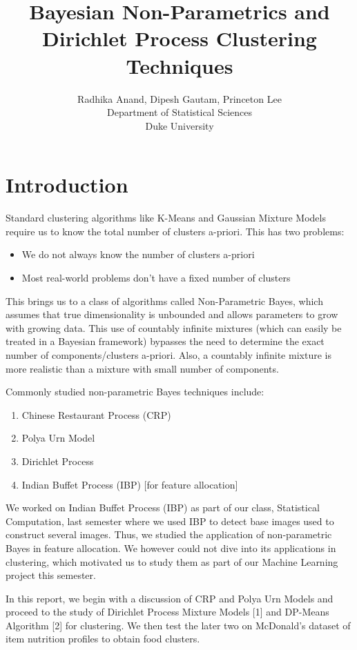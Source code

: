 \documentclass{article} %
\title{Bayesian Non-Parametrics and Dirichlet Process Clustering Techniques}
\author{
Radhika Anand, Dipesh Gautam, Princeton Lee\\
Department of Statistical Sciences\\
Duke University\\
}
\begin{document}
\maketitle

\section{Introduction}
Standard clustering algorithms like K-Means and Gaussian Mixture Models require us to know the total number of clusters a-priori. This has two problems:
\begin{itemize}
\item We do not always know the number of clusters a-priori
\item Most real-world problems don't have a fixed number of clusters
\end{itemize}
This brings us to a class of algorithms called Non-Parametric Bayes, which assumes that true dimensionality is unbounded and allows parameters to grow with growing data. This use of countably infinite mixtures (which can easily be treated in a Bayesian framework) bypasses the need to determine the exact number of components/clusters a-priori. Also, a countably infinite mixture is more realistic than a mixture with small number of components.

Commonly studied non-parametric Bayes techniques include:
\begin{enumerate}
\item Chinese Restaurant Process (CRP)
\item Polya Urn Model
\item Dirichlet Process
\item Indian Buffet Process (IBP) [for feature allocation]
\end{enumerate}

We worked on Indian Buffet Process (IBP) as part of our class, Statistical Computation, last semester where we used IBP to detect base images used to construct several images. Thus, we studied the application of non-parametric Bayes in feature allocation. We however could not dive into its applications in clustering, which motivated us to study them as part of our Machine Learning project this semester.

In this report, we begin with a discussion of CRP and Polya Urn Models and proceed to the study of Dirichlet Process Mixture Models [1] and DP-Means Algorithm [2] for clustering. We then test the later two on McDonald's dataset of item nutrition profiles to obtain food clusters.
 
\end{document}
